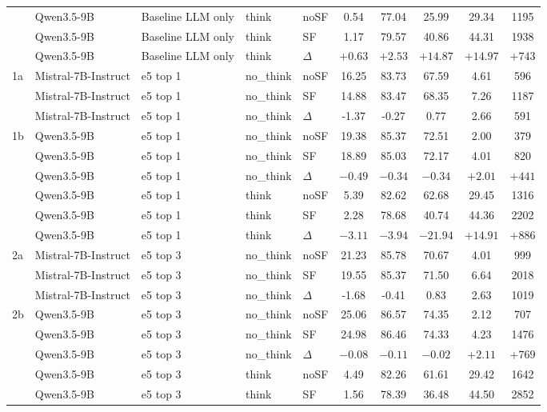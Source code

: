 \begin{scriptsize}
\begin{longtable}{l l l l l c c c c c}
 & Qwen3.5-9B & Baseline LLM only & think & noSF & 0.54 & 77.04 & 25.99 & 29.34 & 1195 \\
 & Qwen3.5-9B & Baseline LLM only & think & SF & 1.17 & 79.57 & 40.86 & 44.31 & 1938 \\
 & Qwen3.5-9B & Baseline LLM only & think & $\Delta$ & $+0.63$ & $+2.53$ & $+14.87$ & $+14.97$ & $+743$ \\
\dmidrule
1a & Mistral-7B-Instruct & e5 top 1 & no\_think & noSF & 16.25 & 83.73 & 67.59 & 4.61 & 596 \\
 & Mistral-7B-Instruct & e5 top 1 & no\_think & SF & 14.88 & 83.47 & 68.35 & 7.26 & 1187 \\
 & Mistral-7B-Instruct & e5 top 1 & no\_think & $\Delta$ & -1.37 & -0.27 & 0.77 & 2.66 & 591 \\
1b & Qwen3.5-9B & e5 top 1 & no\_think & noSF & 19.38 & 85.37 & 72.51 & 2.00 & 379 \\
 & Qwen3.5-9B & e5 top 1 & no\_think & SF & 18.89 & 85.03 & 72.17 & 4.01 & 820 \\
 & Qwen3.5-9B & e5 top 1 & no\_think & $\Delta$ & $-0.49$ & $-0.34$ & $-0.34$ & $+2.01$ & $+441$ \\
 & Qwen3.5-9B & e5 top 1 & think & noSF & 5.39 & 82.62 & 62.68 & 29.45 & 1316 \\
 & Qwen3.5-9B & e5 top 1 & think & SF & 2.28 & 78.68 & 40.74 & 44.36 & 2202 \\
 & Qwen3.5-9B & e5 top 1 & think & $\Delta$ & $-3.11$ & $-3.94$ & $-21.94$ & $+14.91$ & $+886$ \\
\dmidrule
2a & Mistral-7B-Instruct & e5 top 3 & no\_think & noSF & 21.23 & 85.78 & 70.67 & 4.01 & 999 \\
 & Mistral-7B-Instruct & e5 top 3 & no\_think & SF & 19.55 & 85.37 & 71.50 & 6.64 & 2018 \\
 & Mistral-7B-Instruct & e5 top 3 & no\_think & $\Delta$ & -1.68 & -0.41 & 0.83 & 2.63 & 1019 \\
2b & Qwen3.5-9B & e5 top 3 & no\_think & noSF & 25.06 & 86.57 & 74.35 & 2.12 & 707 \\
 & Qwen3.5-9B & e5 top 3 & no\_think & SF & 24.98 & 86.46 & 74.33 & 4.23 & 1476 \\
 & Qwen3.5-9B & e5 top 3 & no\_think & $\Delta$ & $-0.08$ & $-0.11$ & $-0.02$ & $+2.11$ & $+769$ \\
 & Qwen3.5-9B & e5 top 3 & think & noSF & 4.49 & 82.26 & 61.61 & 29.42 & 1642 \\
 & Qwen3.5-9B & e5 top 3 & think & SF & 1.56 & 78.39 & 36.48 & 44.50 & 2852 \\

\end{longtable}
\end{scriptsize}
